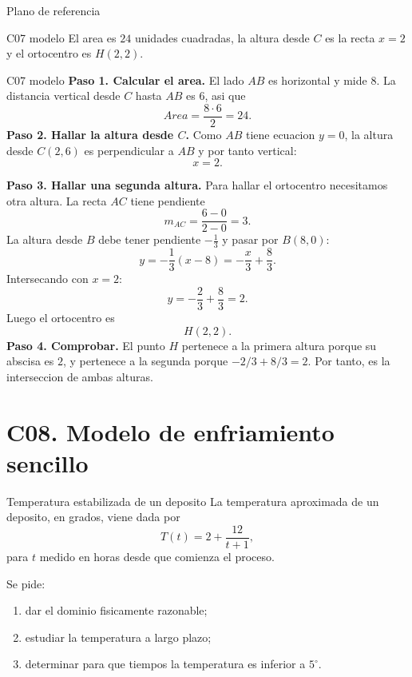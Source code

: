 \begin{databox}{Plano de referencia}
\begin{center}
\end{center}
\end{databox}

\begin{shortanswer}{C07 modelo}
El area es \(24\) unidades cuadradas, la altura desde \(C\) es la recta \(x=2\) y el
ortocentro es \(H(2,2)\).
\end{shortanswer}

\begin{fullsolution}{C07 modelo}
\textbf{Paso 1. Calcular el area.}
El lado \(AB\) es horizontal y mide \(8\). La distancia vertical desde \(C\) hasta \(AB\) es
\(6\), asi que
\[
Area=\frac{8\cdot 6}{2}=24.
\]
\textbf{Paso 2. Hallar la altura desde \(C\).}
Como \(AB\) tiene ecuacion \(y=0\), la altura desde \(C(2,6)\) es perpendicular a \(AB\) y por
tanto vertical:
\[
x=2.
\]

\textbf{Paso 3. Hallar una segunda altura.}
Para hallar el ortocentro necesitamos otra altura. La recta \(AC\) tiene pendiente
\[
m_{AC}=\frac{6-0}{2-0}=3.
\]
La altura desde \(B\) debe tener pendiente \(-\frac13\) y pasar por \(B(8,0)\):
\[
y=-\frac13(x-8)=-\frac{x}{3}+\frac{8}{3}.
\]
Intersecando con \(x=2\):
\[
y=-\frac{2}{3}+\frac{8}{3}=2.
\]
Luego el ortocentro es
\[
H(2,2).
\]
\textbf{Paso 4. Comprobar.} El punto \(H\) pertenece a la primera altura porque su abscisa es
\(2\), y pertenece a la segunda porque
\(-2/3+8/3=2\). Por tanto, es la interseccion de ambas alturas.
\end{fullsolution}

\section{C08. Modelo de enfriamiento sencillo}

\begin{contextproblem}{Temperatura estabilizada de un deposito}
La temperatura aproximada de un deposito, en grados, viene dada por
\[
T(t)=2+\frac{12}{t+1},
\]
para \(t\) medido en horas desde que comienza el proceso.

Se pide:
\begin{enumerate}
  \item dar el dominio fisicamente razonable;
  \item estudiar la temperatura a largo plazo;
  \item determinar para que tiempos la temperatura es inferior a \(5^\circ\).
\end{enumerate}
\end{contextproblem}

